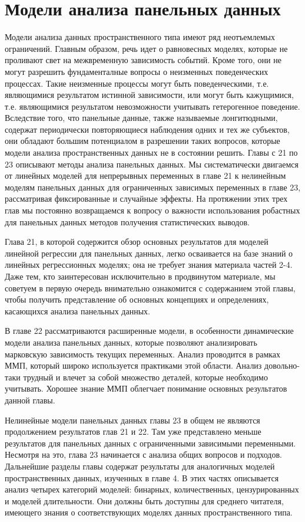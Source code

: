 


\part{Модели анализа панельных данных}


Модели анализа данных пространственного типа имеют ряд неотъемлемых ограничений.  Главным образом, речь идет о равновесных моделях, которые не проливают свет на межвременную зависимость событий. Кроме того, они не могут разрешить фундаменталные вопросы о неизменных поведенческих процессах. Такие неизменные процессы могут быть поведенческими, т.е. являющимися результатом истинной зависимости, или могут быть кажущимися, т.е. являющимися результатом невозможности учитывать гетерогенное поведение. Вследствие того, что панельные данные, также называемые лонгитюдными, содержат периодически повторяющиеся наблюдения одних и тех же субъектов, они обладают большим потенциалом в разрешении таких вопросов, которые модели анализа пространственных данных не в состоянии решить.
Главы с 21 по 23 описывают методы анализа панельных данных. Мы систематически двигаемся от линейных моделей для непрерывных переменных в главе 21 к нелинейным моделям панельных данных для ограниченных зависимых переменных в главе 23, рассматривая фиксированные и случайные эффекты. На протяжении этих трех глав 
мы постоянно возвращаемся к вопросу о важности использования робастных для панельных данных методов получения статистических выводов.

Глава 21, в которой содержится обзор основных результатов для моделей линейной регрессии для панельных данных, легко осваивается на базе знаний о линейных регрессионных моделях; она не требует знания материала частей 2-4. Даже тем, кто заинтересован исключительно в продвинутом материале, мы советуем в первую очередь внимательно ознакомится  с содержанием этой главы, чтобы получить представление об основных концепциях и определениях, касающихся анализа панельных данных.

В главе 22 рассматриваются расширенные модели, в особенности динамические модели анализа панельных данных, которые позволяют анализировать марковскую зависимость текущих переменных. Анализ проводится в рамках ММП, который широко используется практиками этой области. Анализ довольно-таки трудный и влечет за собой множество деталей, которые необходимо учитывать. Хорошее знание ММП облегчает понимание основных результатов данной главы.

Нелинейные модели панельных данных главы 23 в общем не являются продолжением результатов глав 21 и 22. Там уже представлено меньше результатов для панельных данных с ограниченными зависимыми переменными. Несмотря на это, глава 23 начинается с анализа общих вопросов и подходов. Дальнейшие разделы главы содержат результаты для аналогичных моделей пространственных данных, изученных в главе 4. В этих частях описывается анализ четырех категорий моделей: бинарных, количественных, цензурированных и моделей длительности. Они должны быть доступны для среднего читателя, имеющего знания о соответствующих моделях  данных пространственного типа.

